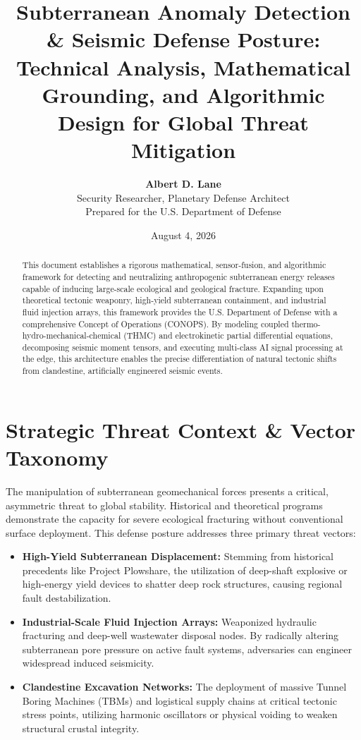 \documentclass[11pt,a4paper]{article}
\title{\textbf{Subterranean Anomaly Detection \& Seismic Defense Posture: \\ 
\large Technical Analysis, Mathematical Grounding, and Algorithmic Design for Global Threat Mitigation}}
\author{\textbf{Albert D. Lane} \\ 
Security Researcher, Planetary Defense Architect \\ 
Prepared for the U.S. Department of Defense}
\date{August 4, 2026}
\begin{document}
\maketitle

\begin{abstract}
This document establishes a rigorous mathematical, sensor-fusion, and algorithmic framework for detecting and neutralizing anthropogenic subterranean energy releases capable of inducing large-scale ecological and geological fracture. Expanding upon theoretical tectonic weaponry, high-yield subterranean containment, and industrial fluid injection arrays, this framework provides the U.S. Department of Defense with a comprehensive Concept of Operations (CONOPS). By modeling coupled thermo-hydro-mechanical-chemical (THMC) and electrokinetic partial differential equations, decomposing seismic moment tensors, and executing multi-class AI signal processing at the edge, this architecture enables the precise differentiation of natural tectonic shifts from clandestine, artificially engineered seismic events.
\end{abstract}

\section{Strategic Threat Context \& Vector Taxonomy}
The manipulation of subterranean geomechanical forces presents a critical, asymmetric threat to global stability. Historical and theoretical programs demonstrate the capacity for severe ecological fracturing without conventional surface deployment. This defense posture addresses three primary threat vectors:

\begin{itemize}
    \item \textbf{High-Yield Subterranean Displacement:} Stemming from historical precedents like Project Plowshare, the utilization of deep-shaft explosive or high-energy yield devices to shatter deep rock structures, causing regional fault destabilization.
    \item \textbf{Industrial-Scale Fluid Injection Arrays:} Weaponized hydraulic fracturing and deep-well wastewater disposal nodes. By radically altering subterranean pore pressure on active fault systems, adversaries can engineer widespread induced seismicity.
    \item \textbf{Clandestine Excavation Networks:} The deployment of massive Tunnel Boring Machines (TBMs) and logistical supply chains at critical tectonic stress points, utilizing harmonic oscillators or physical voiding to weaken structural crustal integrity.
\end{itemize}
\end{document}
